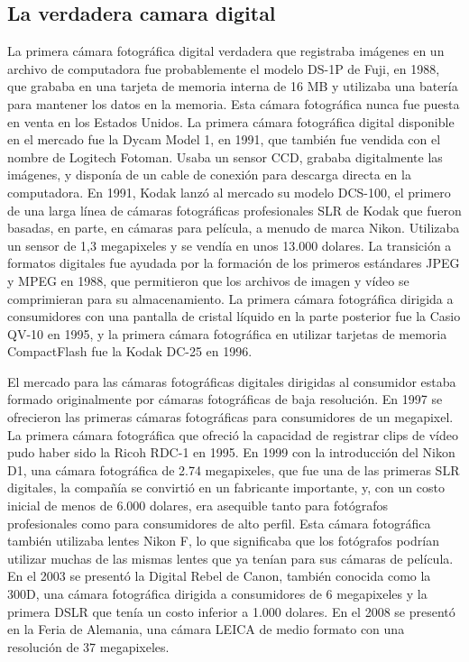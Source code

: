 \documentclass[12pt,a4paper]{report}
\begin{document}
\subsection{La verdadera camara digital }
La primera cámara fotográfica digital verdadera que registraba imágenes en un archivo de computadora fue probablemente el modelo DS-1P de Fuji, en 1988, que grababa en una tarjeta de memoria interna de 16 MB y utilizaba una batería para mantener los datos en la memoria. Esta cámara fotográfica nunca fue puesta en venta en los Estados Unidos. La primera cámara fotográfica digital disponible en el mercado fue la Dycam Model 1, en 1991, que también fue vendida con el nombre de Logitech Fotoman. Usaba un sensor CCD, grababa digitalmente las imágenes, y disponía de un cable de conexión para descarga directa en la computadora.
En 1991, Kodak lanzó al mercado su modelo DCS-100, el primero de una larga línea de cámaras fotográficas profesionales SLR de Kodak que fueron basadas, en parte, en cámaras para película, a menudo de marca Nikon. Utilizaba un sensor de 1,3 megapixeles y se vendía en unos 13.000 dolares.
La transición a formatos digitales fue ayudada por la formación de los primeros estándares JPEG y MPEG en 1988, que permitieron que los archivos de imagen y vídeo se comprimieran para su almacenamiento. La primera cámara fotográfica dirigida a consumidores con una pantalla de cristal líquido en la parte posterior fue la Casio QV-10 en 1995, y la primera cámara fotográfica en utilizar tarjetas de memoria CompactFlash fue la Kodak DC-25 en 1996.

El mercado para las cámaras fotográficas digitales dirigidas al consumidor estaba formado originalmente por cámaras fotográficas de baja resolución. En 1997 se ofrecieron las primeras cámaras fotográficas para consumidores de un megapixel. La primera cámara fotográfica que ofreció la capacidad de registrar clips de vídeo pudo haber sido la Ricoh RDC-1 en 1995.
En 1999 con la introducción del Nikon D1, una cámara fotográfica de 2.74 megapixeles, que fue una de las primeras SLR digitales, la compañía se convirtió en un fabricante importante, y, con un costo inicial de menos de 6.000 dolares, era asequible tanto para fotógrafos profesionales como para consumidores de alto perfil. Esta cámara fotográfica también utilizaba lentes Nikon F, lo que significaba que los fotógrafos podrían utilizar muchas de las mismas lentes que ya tenían para sus cámaras de película.
En el 2003 se presentó la Digital Rebel de Canon, también conocida como la 300D, una cámara fotográfica dirigida a consumidores de 6 megapixeles y la primera DSLR que tenía un costo inferior a 1.000 dolares.
En el 2008 se presentó en la Feria de Alemania, una cámara LEICA de medio formato con una resolución de 37 megapixeles.
\end{document}
